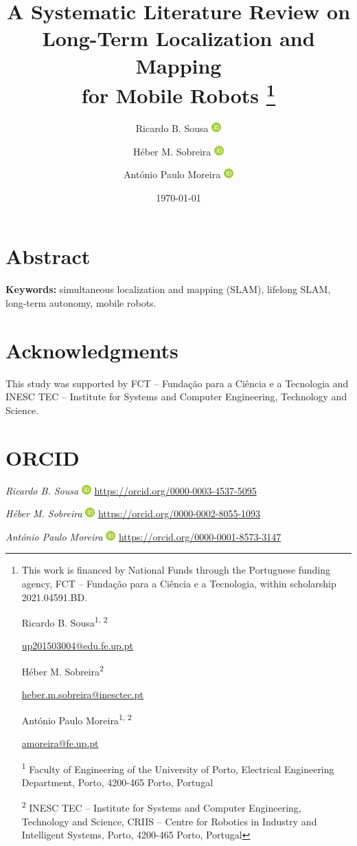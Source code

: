 \documentclass[10pt,a4paper,notitlepage,twocolumn,oneside]{article}
\title{A Systematic Literature Review on Long-Term Localization and Mapping\\for Mobile Robots%
\thanks{%
This work is financed by National Funds through the Portuguese funding agency, FCT -- Fundação para a Ciência e a Tecnologia, within scholarship 2021.04591.BD.

\vspace{1em}
\noindent Ricardo B. Sousa\textsuperscript{1, 2}

\noindent \href{mailto:up201503004@edu.fe.up.pt}{up201503004@edu.fe.up.pt}

\vspace{0.5em}
\noindent H\'{e}ber M. Sobreira\textsuperscript{2}

\noindent \href{mailto:heber.m.sobreira@inesctec.pt}{heber.m.sobreira@inesctec.pt}

\vspace{0.5em}
\noindent Ant\'{o}nio Paulo Moreira\textsuperscript{1, 2}

\noindent \href{mailto:amoreira@fe.up.pt}{amoreira@fe.up.pt}

\vspace{1em}
\noindent \textsuperscript{1} Faculty of Engineering of the University of Porto, Electrical Engineering Department, Porto, 4200-465 Porto, Portugal

\noindent \textsuperscript{2} INESC TEC -- Institute for Systems and Computer Engineering, Technology and Science, CRIIS -- Centre for Robotics in Industry and Intelligent Systems, Porto, 4200-465 Porto, Portugal
}}
\author{%
Ricardo B. Sousa
\href{https://orcid.org/0000-0003-4537-5095}{\includegraphics[width=1em]{orcid.pdf}}%
\and%
H\'{e}ber M. Sobreira
\href{https://orcid.org/0000-0002-8055-1093}{\includegraphics[width=1em]{orcid.pdf}}%
\and%
Ant\'{o}nio Paulo Moreira
\href{https://orcid.org/0000-0001-8573-3147}{\includegraphics[width=1em]{orcid.pdf}}%
}
\date{\today}
\begin{document}
\maketitle

\section*{Abstract}

\hfill\break

\noindent\textbf{Keywords:} simultaneous localization and mapping (SLAM), lifelong SLAM, long-term autonomy, mobile robots.



\section*{Acknowledgments}

This study was supported by FCT -- Fundação para a Ciência e a Tecnologia and INESC TEC -- Institute for Systems and Computer Engineering, Technology and Science.

\section*{ORCID}

\noindent \textit{Ricardo B. Sousa} \includegraphics[width=1em]{orcid.pdf} \href{https://orcid.org/0000-0003-4537-5095}{https://orcid.org/0000-0003-4537-5095}

\noindent \textit{H\'{e}ber M. Sobreira} \includegraphics[width=1em]{orcid.pdf} \href{https://orcid.org/0000-0002-8055-1093}{https://orcid.org/0000-0002-8055-1093}

\noindent \textit{Ant\'{o}nio Paulo Moreira} \includegraphics[width=1em]{orcid.pdf} \href{https://orcid.org/0000-0001-8573-3147}{https://orcid.org/0000-0001-8573-3147}




\printbibliography

%
%
\end{document}
